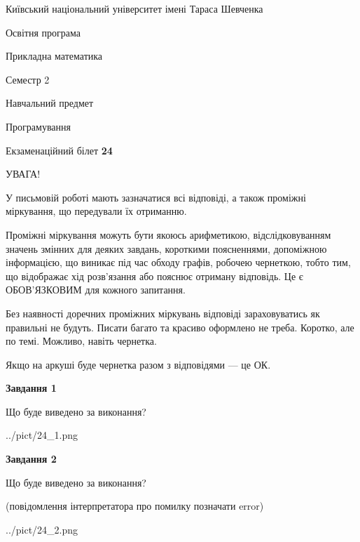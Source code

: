 \documentclass[12pt, ukrainian]{article}
\begin{document}
{{\begin {small}\par
{ \center  Київський національний університет імені Тараса Шевченка \par}
{\parbox {5 cm}{Освітня програма \hfill}{\parbox {7 cm}{Прикладна математика\hfill}}\parbox {6 cm}{\hfill Семестр 2}}\par
{\parbox {5 cm} {Навчальний предмет \hfill}\parbox {7 cm}{Програмування \hfill}\parbox {6cm}{\hfill}\par}\vspace{-7pt} \end{small}}{\center Екзаменаційний білет \No \textbf
{ 24 }\par}}
{
\begin {large}
УВАГА!

У письмовій роботі мають зазначатися всі відповіді, а також проміжні міркування, що передували їх отриманню.

Проміжні міркування можуть бути якоюсь арифметикою, відслідковуванням зна\-чень змінних для деяких завдань,
короткими поясненнями, допоміжною інформацією, що виникає під час обходу графів, робочею чернеткою,
тобто тим, що відображає хід розв’язання або пояснює отриману відповідь.
Це є ОБОВ’ЯЗКОВИМ для кожного запитання.

Без наявності доречних проміжних міркувань відповіді зараховуватись як правиль\-ні не будуть.
Писати багато та красиво оформлено не треба. Коротко, але по темі. Можли\-во, навіть чернетка.

Якщо на аркуші буде чернетка разом з відповідями --- це ОК.

\newpage

{\begin {center}\textbf{Завдання 1}\end {center}}\par
Що буде виведено за виконання?\par
\begin{center}
	{../pict/24_1.png}
\end{center}
\newpage

{\begin {center}\textbf{Завдання 2}\end {center}}\par
Що буде виведено за виконання?\par
 (повідомлення інтерпретатора про помилку позначати error)\par
\begin{center}
	{../pict/24_2.png}
\end{center}
\newpage


\end{large}}
\end{document}
